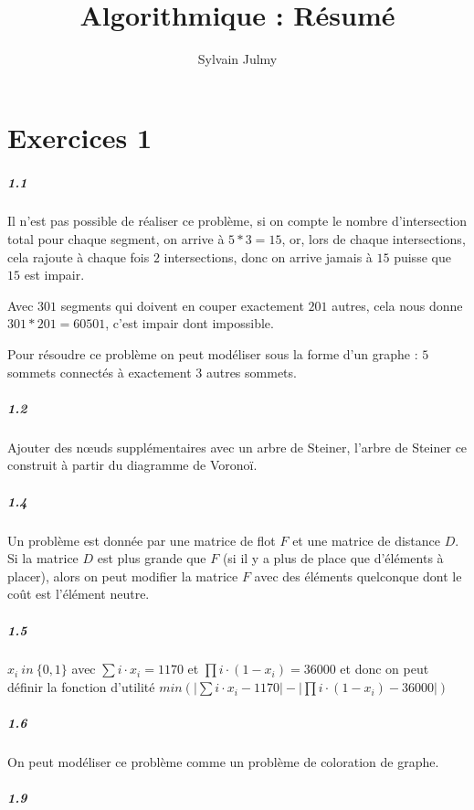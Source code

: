 \documentclass[11pt,a4paper]{report}
\author{Sylvain Julmy}
\title{Algorithmique : Résumé}
\begin{document}
\chapter{Exercices 1}
\paragraph*{1.1} Il n'est pas possible de réaliser ce problème, si on compte le nombre d'intersection total pour chaque segment, on arrive à $5*3=15$, or, lors de chaque intersections, cela rajoute à chaque fois $2$ intersections, donc on arrive jamais à $15$ puisse que $15$ est impair.

Avec $301$ segments qui doivent en couper exactement $201$ autres, cela nous donne $301*201=60501$, c'est impair dont impossible.

Pour résoudre ce problème on peut modéliser sous la forme d'un graphe : $5$ sommets connectés à exactement $3$ autres sommets.

\paragraph*{1.2} Ajouter des nœuds supplémentaires avec un arbre de Steiner, l'arbre de Steiner ce construit à partir du diagramme de Voronoï.

\paragraph*{1.4} Un problème est donnée par une matrice de flot $F$ et une matrice de distance $D$. Si la matrice $D$ est plus grande que $F$ (si il y a plus de place que d'éléments à placer), alors on peut modifier la matrice $F$ avec des éléments quelconque dont le coût est l'élément neutre.

\paragraph*{1.5} $x_i\ in \ \{0,1\}$ avec $\sum i \cdot x_i = 1170$ et $\prod i \cdot (1-x_i) = 36000$ et donc on peut définir la fonction d'utilité $min(|\sum i \cdot x_i - 1170| - |\prod i \cdot (1-x_i) - 36000|)$

\paragraph*{1.6} On peut modéliser ce problème comme un problème de coloration de graphe.

\paragraph*{1.9} 
\end{document}
